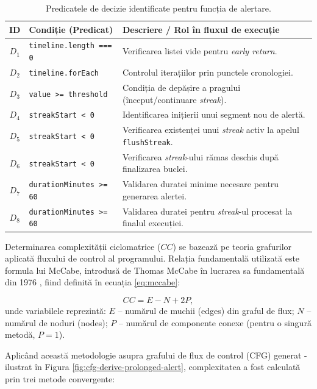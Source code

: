 \begin{table}[htbp]
	\centering
	\begin{tabular}{|c|l|p{8.5cm}|}
		\hline
		\textbf{ID} & \textbf{Condiție (Predicat)} & \textbf{Descriere / Rol în fluxul de execuție} \\ \hline
		$D_1$ & \texttt{timeline.length === 0} & Verificarea listei vide pentru \textit{early return}. \\ \hline
		$D_2$ & \texttt{timeline.forEach} & Controlul iterațiilor prin punctele cronologiei. \\ \hline
		$D_3$ & \texttt{value >= threshold} & Condiția de depășire a pragului (început/continuare \textit{streak}). \\ \hline
		$D_4$ & \texttt{streakStart < 0} & Identificarea inițierii unui segment nou de alertă. \\ \hline
		$D_5$ & \texttt{streakStart < 0} & Verificarea existenței unui \textit{streak} activ la apelul \texttt{flushStreak}. \\ \hline
		$D_6$ & \texttt{streakStart < 0} & Verificarea \textit{streak}-ului rămas deschis după finalizarea buclei. \\ \hline
		$D_7$ & \texttt{durationMinutes >= 60} & Validarea duratei minime necesare pentru generarea alertei. \\ \hline
		$D_8$ & \texttt{durationMinutes >= 60} & Validarea duratei pentru \textit{streak}-ul procesat la finalul execuției. \\ \hline
	\end{tabular}
	\caption{Predicatele de decizie identificate pentru funcția de alertare.}
	\label{tab:complexitate-ciclomatica}
\end{table}

Determinarea complexității ciclomatrice ($CC$) se bazează pe teoria grafurilor aplicată fluxului de control al programului. Relația fundamentală utilizată este formula lui McCabe, introdusă de Thomas McCabe în lucrarea sa fundamentală din 1976 \cite{mccabe1976}, fiind definită în ecuația \eqref{eq:mccabe}:

\begin{equation} \label{eq:mccabe}
	CC = E - N + 2P,
\end{equation}
unde variabilele reprezintă:
$E$ -- numărul de muchii (edges) din graful de flux; $N$ -- numărul de noduri (nodes); $P$ -- numărul de componente conexe (pentru o singură metodă, $P=1$).

Aplicând această metodologie asupra grafului de flux de control (CFG) generat - ilustrat în Figura \ref{fig:cfg-derive-prolonged-alert}, complexitatea a fost calculată prin trei metode convergente:

